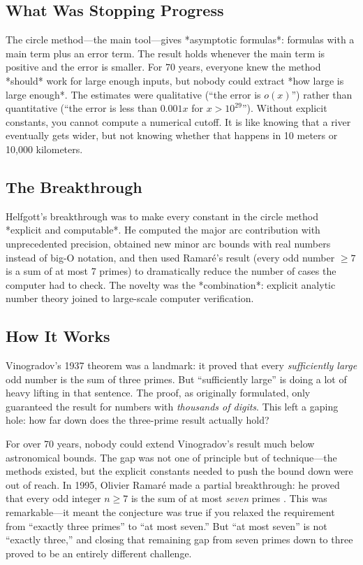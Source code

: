\subsection{What Was Stopping Progress}
The circle method---the main tool---gives *asymptotic formulas*: formulas with a main term plus an error term. The result holds whenever the main term is positive and the error is smaller. For 70 years, everyone knew the method *should* work for large enough inputs, but nobody could extract *how large is large enough*. The estimates were qualitative (``the error is $o(x)$'') rather than quantitative (``the error is less than $0.001x$ for $x > 10^{29}$''). Without explicit constants, you cannot compute a numerical cutoff. It is like knowing that a river eventually gets wider, but not knowing whether that happens in 10 meters or 10,000 kilometers.

\subsection{The Breakthrough}
Helfgott's breakthrough was to make every constant in the circle method *explicit and computable*. He computed the major arc contribution with unprecedented precision, obtained new minor arc bounds with real numbers instead of big-O notation, and then used Ramaré's result (every odd number $\geq 7$ is a sum of at most 7 primes) to dramatically reduce the number of cases the computer had to check. The novelty was the *combination*: explicit analytic number theory joined to large-scale computer verification.

\subsection{How It Works}

Vinogradov's 1937 theorem was a landmark: it proved that every \emph{sufficiently large} odd number is the sum of three primes. But ``sufficiently large'' is doing a lot of heavy lifting in that sentence. The proof, as originally formulated, only guaranteed the result for numbers with \emph{thousands of digits}. This left a gaping hole: how far down does the three-prime result actually hold?

For over 70 years, nobody could extend Vinogradov's result much below astronomical bounds. The gap was not one of principle but of technique---the methods existed, but the explicit constants needed to push the bound down were out of reach. In 1995, Olivier Ramar\'e made a partial breakthrough: he proved that every odd integer $n \geq 7$ is the sum of at most \emph{seven} primes \cite{ramare1995}. This was remarkable---it meant the conjecture was true if you relaxed the requirement from ``exactly three primes'' to ``at most seven.'' But ``at most seven'' is not ``exactly three,'' and closing that remaining gap from seven primes down to three proved to be an entirely different challenge.

